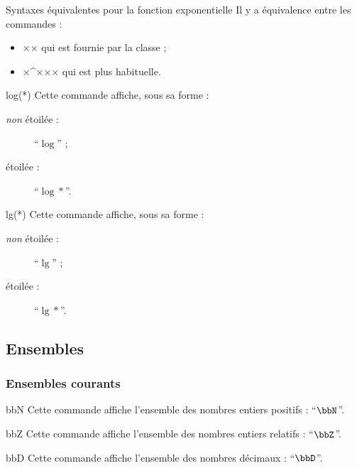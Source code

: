 \documentclass[french,nolocaltoc]{nwejmart}
\newtheorem[style=definition]{fait}
\newtheorem[title=contraventionnalisation]{ctrv}
\newtheorem[title-plural=anneaux]{anneau}
\newtheorem[title-plural=idéaux]{idéal}
\begin{document}
\begin{dbremark}{Syntaxes équivalentes pour la fonction exponentielle}{}
  Il y a équivalence entre les commandes :
  \begin{itemize}
  \item ×× qui est fournie par la classe ;
  \item ×\E^{××}× qui est plus habituelle.
\end{itemize}
\end{dbremark}

\begin{docCommand}{log(*)}{}
  Cette commande affiche, sous sa forme :
  \begin{description}
  \item[\emph{non} étoilée :] \enquote{$\log$} ;
  \item[étoilée :] \enquote{$\log*$}.
  \end{description}
\end{docCommand}

\begin{docCommand}{lg(*)}{}
  Cette commande affiche, sous sa forme :
  \begin{description}
  \item[\emph{non} étoilée :] \enquote{$\lg$} ;
  \item[étoilée :] \enquote{$\lg*$}.
  \end{description}
\end{docCommand}

\subsection{Ensembles}

\subsubsection{Ensembles courants}

\begin{docCommand}{bbN}{}
  Cette commande affiche l'ensemble des nombres entiers positifs :
  \enquote{$\bbN$}.
\end{docCommand}

\begin{docCommand}{bbZ}{}
  Cette commande affiche l'ensemble des nombres entiers relatifs :
  \enquote{$\bbZ$}.
\end{docCommand}

\begin{docCommand}{bbD}{}
  Cette commande affiche l'ensemble des nombres décimaux : \enquote{$\bbD$}.
\end{docCommand}
\end{document}
